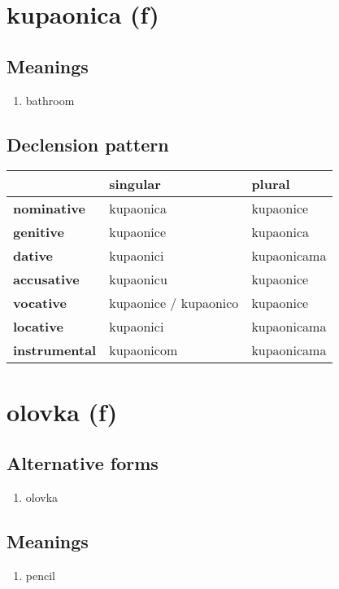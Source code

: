 \filbreak
\section{kupaonica (f)}
\subsection*{Meanings}
\begin{enumerate}
\item bathroom
\end{enumerate}
\subsection*{Declension pattern}
\begin{tabularx}{\linewidth}{Xll}
\toprule
{} &               singular &       plural \\
\midrule
\textbf{nominative  } &              kupaonica &    kupaonice \\
\textbf{genitive    } &              kupaonice &    kupaonica \\
\textbf{dative      } &              kupaonici &  kupaonicama \\
\textbf{accusative  } &              kupaonicu &    kupaonice \\
\textbf{vocative    } &  kupaonice / kupaonico &    kupaonice \\
\textbf{locative    } &              kupaonici &  kupaonicama \\
\textbf{instrumental} &             kupaonicom &  kupaonicama \\
\bottomrule
\end{tabularx}

\filbreak
\section{olovka (f)}
\subsection*{Alternative forms}
\begin{enumerate}
\item olovka
\end{enumerate}
\subsection*{Meanings}
\begin{enumerate}
\item pencil
\end{enumerate}
